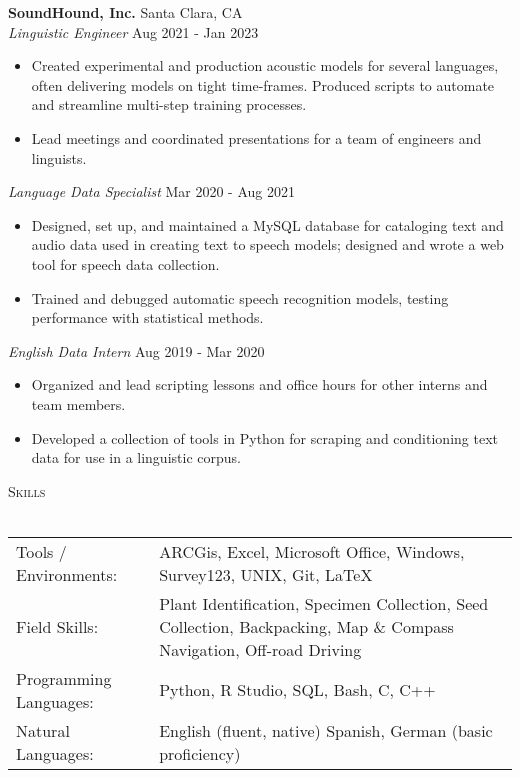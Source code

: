 \documentclass[]{article}
\newcommand{\lineunder} {
	\vspace*{-8pt} \\
	\hspace*{-18pt} \hrulefill \\
}
\newcommand{\header} [1] {
	{\hspace*{-18pt}\vspace*{6pt} \textsc{#1}}
	\vspace*{-6pt} \lineunder
}
\begin{document}
	
	\textbf{SoundHound, Inc.} \hfill Santa Clara, CA\\
	\textit{Linguistic Engineer} \hfill Aug 2021 - Jan 2023\\
	\vspace{-3mm}
	\begin{itemize} \itemsep 0pt
		\item Created experimental and production acoustic models for several languages, often delivering models on tight time-frames.  Produced scripts to automate and streamline multi-step training processes.
		\item Lead meetings and coordinated presentations for a team of engineers and linguists.
	\end{itemize}
	\vspace{-2mm}
	\textit{Language Data Specialist} \hfill Mar 2020 - Aug 2021\\
	\vspace{-3mm}
	\begin{itemize} \itemsep 0pt
		\item Designed, set up, and maintained a MySQL database for cataloging text and audio data used in creating text to speech models; designed and wrote a web tool for speech data collection.
		\item Trained and debugged automatic speech recognition models, testing performance with statistical methods.
	\end{itemize}
	\vspace{-2mm}
	\textit{English Data Intern} \hfill Aug 2019 - Mar 2020\\
	\vspace{-3mm}
	\begin{itemize} \itemsep 0pt
		\item Organized and lead scripting lessons and office hours for other interns and team members.
		\item Developed a collection of tools in Python for scraping and conditioning text data for use in a linguistic corpus.
	\end{itemize}

	\vspace{5mm}

	\header{Skills}
	\begin{tabular}{ p{45mm} p{11.2cm} }
		Tools / Environments:  & ARCGis, Excel, Microsoft Office, Windows, Survey123, UNIX, Git, \LaTeX
		\\
		Field Skills:          & Plant Identification, Specimen Collection, Seed Collection, Backpacking, Map \& Compass Navigation, Off-road Driving\\
		Programming Languages: & Python, R Studio, SQL, Bash, C, C++
		\\
		Natural Languages:     & English \hfill (fluent, native) \newline  Spanish, German \hfill (basic proficiency)
		\\
	\end{tabular}
	\vspace{2mm}
	
\end{document}
